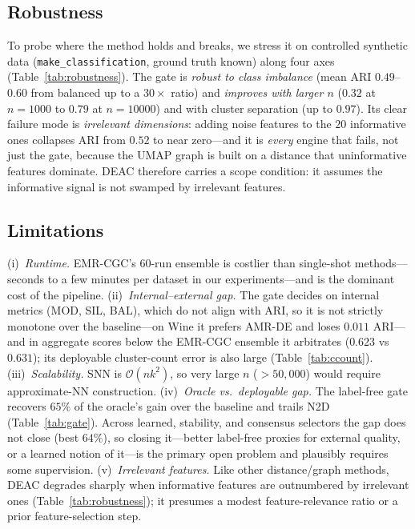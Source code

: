 \documentclass[journal]{IEEEtran}
\begin{document}
\subsection{Robustness}

To probe where the method holds and breaks, we stress it on controlled synthetic data (\texttt{make\_classification}, ground truth known) along four axes (Table~\ref{tab:robustness}). The gate is \emph{robust to class imbalance} (mean ARI $0.49$--$0.60$ from balanced up to a $30{\times}$ ratio) and \emph{improves with larger $n$} ($0.32$ at $n{=}1000$ to $0.79$ at $n{=}10000$) and with cluster separation (up to $0.97$). Its clear failure mode is \emph{irrelevant dimensions}: adding noise features to the $20$ informative ones collapses ARI from $0.52$ to near zero---and it is \emph{every} engine that fails, not just the gate, because the UMAP graph is built on a distance that uninformative features dominate. DEAC therefore carries a scope condition: it assumes the informative signal is not swamped by irrelevant features.



\subsection{Limitations}

(i)~\emph{Runtime.} EMR-CGC's 60-run ensemble is costlier than single-shot methods---seconds to a few minutes per dataset in our experiments---and is the dominant cost of the pipeline.
(ii)~\emph{Internal--external gap.} The gate decides on internal metrics (MOD, SIL, BAL), which do not align with ARI, so it is not strictly monotone over the baseline---on Wine it prefers AMR-DE and loses $0.011$ ARI---and in aggregate scores below the EMR-CGC ensemble it arbitrates ($0.623$ vs $0.631$); its deployable cluster-count error is also large (Table~\ref{tab:ccount}).
(iii)~\emph{Scalability.} SNN is $\mathcal{O}(n k^2)$, so very large $n$ ($>50{,}000$) would require approximate-NN construction.
(iv)~\emph{Oracle vs.\ deployable gap.} The label-free gate recovers $65\%$ of the oracle's gain over the baseline and trails N2D (Table~\ref{tab:gate}). Across learned, stability, and consensus selectors the gap does not close (best $64\%$), so closing it---better label-free proxies for external quality, or a learned notion of it---is the primary open problem and plausibly requires some supervision.
(v)~\emph{Irrelevant features.} Like other distance/graph methods, DEAC degrades sharply when informative features are outnumbered by irrelevant ones (Table~\ref{tab:robustness}); it presumes a modest feature-relevance ratio or a prior feature-selection step.
\end{document}
